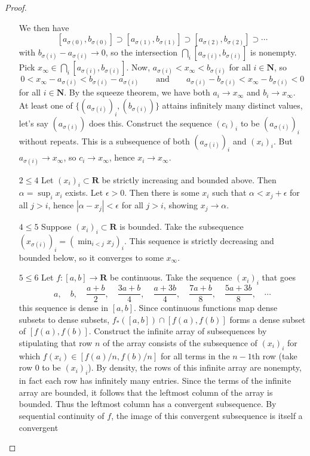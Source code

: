 \documentclass[oneside, 12pt]{memoir}
\theoremstyle{elegant}
\theoremstyle{elegant}
\def\RR{\mathbf R}
\def\NN{\mathbf N}
\begin{document}
\begin{proof}
\begin{itemize}
We then have
\[[a_{\sigma(0)}, b_{\sigma(0)}]\supset[a_{\sigma(1)}, b_{\sigma(1)}]\supset[a_{\sigma(2)}, b_{\sigma(2)}]
\supset\cdots
\]
with $b_{\sigma(i)} - a_{\sigma(i)}\to 0$, so the
intersection $\bigcap_i[a_{\sigma(i)}, b_{\sigma(i)}]$ is nonempty. Pick $x_\infty\in\bigcap_i[a_{\sigma(i)}, b_{\sigma(i)}]$. Now,
$a_{\sigma(i)} < x_\infty < b_{\sigma(i)}$ for all $i\in\NN$, so
\[0 < x_\infty - a_{\sigma(i)} < b_{\sigma(i)} - a_{\sigma(i)}\qquad\text{and}\qquad
a_{\sigma(i)} - b_{\sigma(i)} < x_\infty - b_{\sigma(i)} < 0\]
for all $i\in\NN$. By the squeeze theorem, we have both $a_i\to x_\infty$ and $b_i\to x_\infty$.
At least one of $\{(a_{\sigma(i)})_i, (b_{\sigma(i)})\}$ attains
infinitely many distinct values, let's say $(a_{\sigma(i)})$ does this.
Construct the sequence $(c_i)_i$ to be $(a_{\sigma(i)})_i$
without repeats. This is a subsequence of both $(a_{\sigma(i)})_i$
and $(x_i)_i$. But $a_{\sigma(i)}\to x_\infty$,
so $c_i\to x_\infty$, hence $x_i\to x_\infty$.
\item[$2\le 4$] Let $(x_i)_i\subset\RR$ be strictly increasing and bounded above.
Then $\alpha = \sup_ix_i$ exists. Let $\epsilon > 0$. Then there is some $x_i$
such that $\alpha < x_j + \epsilon$ for all $j > i$,
hence $|\alpha - x_j| < \epsilon$ for all $j > i$,
showing $x_j\to\alpha$.
\item[$4\le 5$] Suppose $(x_i)_i\subset\RR$ is bounded.
Take the subsequence $(x_{\sigma(i)})_i = (\min_{i < j}x_j)_i$.
This sequence is strictly decreasing and bounded below, so it converges
to some $x_\infty$.
\item[$5\le 6$]
Let $f:[a, b]\to\RR$ be continuous.
Take the sequence $(x_i)_i$ that goes
\[a,\quad b,\quad\frac{a + b}{2},\quad\frac{3a + b}{4},\quad\frac{a + 3b}{4},\quad\frac{7a + b}{8},\quad\frac{5a + 3b}{8},\quad\cdots\]
this sequence is dense in $[a, b]$. Since continuous functions map dense subsets to dense subsets,
$f_*([a, b])\cap[f(a), f(b)]$ forms a dense subset of $[f(a), f(b)]$.
Construct the infinite array of subsequences by stipulating that row $n$ of the array consists of the
subsequence of $(x_i)_i$ for which $f(x_i)\in[f(a)/n, f(b)/n]$ for all terms in the $n-1$th row (take row $0$ to be $(x_i)_i$).
By density, the rows of this infinite array are nonempty, in fact each row has infinitely many entries.
Since the terms of the infinite array are bounded, it follows that the leftmost column of the array is bounded. Thus the
leftmost column has a convergent subsequence. By sequential continuity of $f$, the image of this convergent subsequence is itself a convergent

\end{itemize}
\end{proof}
\end{document}
